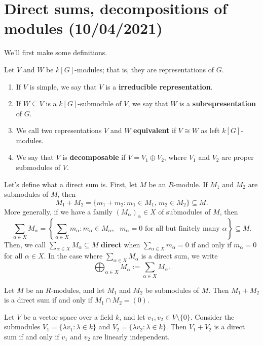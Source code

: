 \section{Direct sums, decompositions of modules (10/04/2021)}
We'll first make some definitions. 

\begin{defn}{} 
    Let $V$ and $W$ be $k[G]$-modules; that is, they are 
    representations of $G$. 
    \begin{enumerate}[(1)]
        \item If $V$ is simple, we say that $V$ is a {\bf irreducible representation}.
        \item If $W \subseteq V$ is a $k[G]$-submodule of $V$, we say that $W$ is a 
        {\bf subrepresentation} of $G$. 
        \item We call two representations $V$ and $W$ {\bf equivalent} if 
        $V \cong W$ as left $k[G]$-modules. 
        \item We say that $V$ is {\bf decomposable} if $V = V_1 \oplus V_2$, 
        where $V_1$ and $V_2$ are proper submodules of $V$. 
    \end{enumerate}
\end{defn}

Let's define what a direct sum is. First, let $M$ be an $R$-module. 
If $M_1$ and $M_2$ are submodules of $M$, then 
\[ M_1 + M_2 = \{m_1 + m_2 : m_1 \in M_1,\, m_2 \in M_2\} \subseteq M. \] 
More generally, if we have a family $(M_\alpha)_\alpha \in X$ of submodules of 
$M$, then 
\[ \sum_{\alpha \in X} M_\alpha = \left\{ \sum_{\alpha \in X} m_\alpha : 
m_\alpha \in M_\alpha, \text{ $m_\alpha = 0$ for all but finitely many 
$\alpha$}\right\} \subseteq M. \] 
Then, we call $\sum_{\alpha \in X} M_\alpha \subseteq M$ 
{\bf direct} when $\sum_{\alpha \in X} m_\alpha = 0$ if and only if 
$m_\alpha = 0$ for all $\alpha \in X$. In the case where 
$\sum_{\alpha \in X} M_\alpha$ is a direct sum, we write 
\[ \bigoplus_{\alpha \in X} M_\alpha := \sum_{\alpha \in X} M_\alpha. \] 

\begin{remark}{}
    Let $M$ be an $R$-modules, and let $M_1$ and $M_2$ be submodules of $M$. 
    Then $M_1 + M_2$ is a direct sum if and only if $M_1 \cap M_2 = (0)$. 
\end{remark} 

\begin{exmp}{}
    Let $V$ be a vector space over a field $k$, and let $v_1, v_2 \in V 
    \setminus \{0\}$. Consider the submodules $V_1 = \{\lambda v_1 : \lambda 
    \in k\}$ and $V_2 = \{\lambda v_2 : \lambda \in k\}$. Then $V_1 + V_2$ is a 
    direct sum if and only if $v_1$ and $v_2$ are linearly independent. 
\end{exmp}

